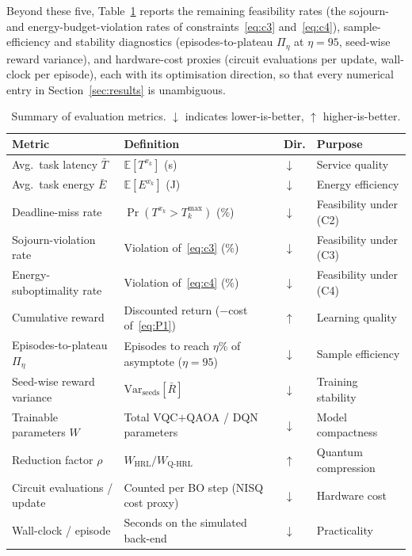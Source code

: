 \documentclass[11pt,a4paper]{article}
\theoremstyle{definition}
\begin{document}
\noindent Beyond these five, Table~\ref{tab:metrics_summary} reports the remaining feasibility rates (the sojourn- and energy-budget-violation rates of constraints~\eqref{eq:c3} and~\eqref{eq:c4}), sample-efficiency and stability diagnostics (episodes-to-plateau $\Pi_\eta$ at $\eta{=}95$, seed-wise reward variance), and hardware-cost proxies (circuit evaluations per update, wall-clock per episode), each with its optimisation direction, so that every numerical entry in Section~\ref{sec:results} is unambiguous.

\begin{table}[t]
\centering
\small
\caption{Summary of evaluation metrics. $\downarrow$ indicates lower-is-better, $\uparrow$ higher-is-better.}
\label{tab:metrics_summary}
\begin{tabular}{@{}p{4.0cm}p{4.5cm}p{1.2cm}p{4.6cm}@{}}
\toprule
\textbf{Metric} & \textbf{Definition} & \textbf{Dir.} & \textbf{Purpose} \\
\midrule
Avg.\ task latency $\bar T$        & $\mathbb{E}[T^{x_k}]$ (s)                                & $\downarrow$ & Service quality \\
Avg.\ task energy $\bar E$         & $\mathbb{E}[E^{x_k}]$ (J)                                & $\downarrow$ & Energy efficiency \\
Deadline-miss rate                 & $\Pr(T^{x_k}{>}T_k^{\max})$ ($\%$)                       & $\downarrow$ & Feasibility under (C2) \\
Sojourn-violation rate             & Violation of~\eqref{eq:c3} ($\%$)                        & $\downarrow$ & Feasibility under (C3) \\
Energy-suboptimality rate          & Violation of~\eqref{eq:c4} ($\%$)                        & $\downarrow$ & Feasibility under (C4) \\
Cumulative reward                  & Discounted return ($-$cost of~\eqref{eq:P1})             & $\uparrow$   & Learning quality \\
Episodes-to-plateau $\Pi_\eta$     & Episodes to reach $\eta\%$ of asymptote ($\eta{=}95$)    & $\downarrow$ & Sample efficiency \\
Seed-wise reward variance          & $\mathrm{Var}_{\mathrm{seeds}}[\bar R]$                  & $\downarrow$ & Training stability \\
Trainable parameters $W$           & Total VQC$+$QAOA / DQN parameters                        & $\downarrow$ & Model compactness \\
Reduction factor $\rho$            & $W_{\mathrm{HRL}}/W_{\mathrm{Q\text{-}HRL}}$             & $\uparrow$   & Quantum compression \\
Circuit evaluations / update       & Counted per BO step (NISQ cost proxy)                    & $\downarrow$ & Hardware cost \\
Wall-clock / episode               & Seconds on the simulated back-end                        & $\downarrow$ & Practicality \\
\bottomrule
\end{tabular}
\end{table}
\end{document}

